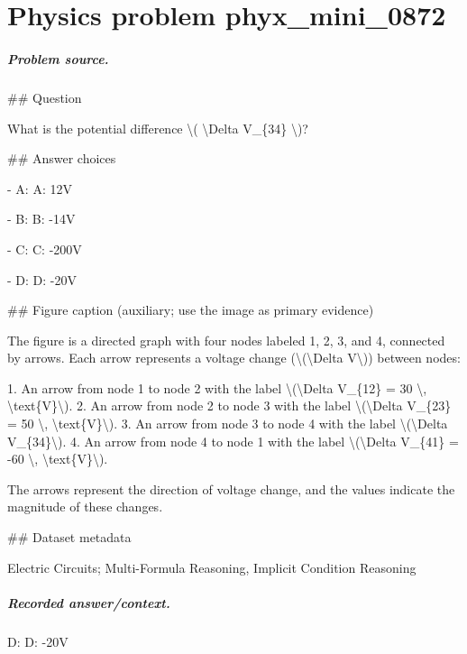 
\chapter{Physics problem phyx\_mini\_0872}
\label{ch:PhyXMiniProblems_problem_phyx_mini_0872}

\paragraph{Problem source.}
\#\# Question

What is the potential difference \textbackslash{}( \textbackslash{}Delta V\_\{34\} \textbackslash{})?

\#\# Answer choices

- A: A: 12V

- B: B: -14V

- C: C: -200V

- D: D: -20V

\#\# Figure caption (auxiliary; use the image as primary evidence)

The figure is a directed graph with four nodes labeled 1, 2, 3, and 4, connected by arrows. Each arrow represents a voltage change (\textbackslash{}(\textbackslash{}Delta V\textbackslash{})) between nodes:

1. An arrow from node 1 to node 2 with the label \textbackslash{}(\textbackslash{}Delta V\_\{12\} = 30 \textbackslash{}, \textbackslash{}text\{V\}\textbackslash{}).
2. An arrow from node 2 to node 3 with the label \textbackslash{}(\textbackslash{}Delta V\_\{23\} = 50 \textbackslash{}, \textbackslash{}text\{V\}\textbackslash{}).
3. An arrow from node 3 to node 4 with the label \textbackslash{}(\textbackslash{}Delta V\_\{34\}\textbackslash{}).
4. An arrow from node 4 to node 1 with the label \textbackslash{}(\textbackslash{}Delta V\_\{41\} = -60 \textbackslash{}, \textbackslash{}text\{V\}\textbackslash{}).

The arrows represent the direction of voltage change, and the values indicate the magnitude of these changes.

\#\# Dataset metadata

Electric Circuits; Multi-Formula Reasoning, Implicit Condition Reasoning

\paragraph{Recorded answer/context.}
D: D: -20V

